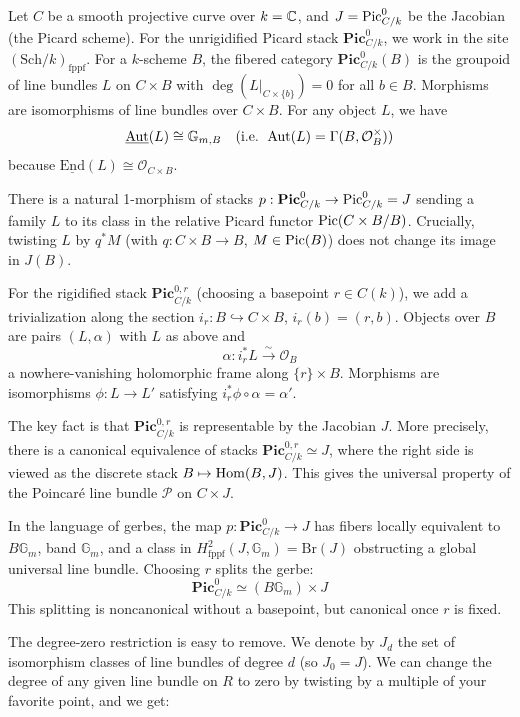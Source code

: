 \documentclass[12pt]{article}
\begin{document}
\begin{remark}
Let $C$ be a smooth projective curve over $k=\mathbb{C}$, and $J=\operatorname{Pic}^0_{C/k}$ be the Jacobian (the Picard scheme). For the unrigidified Picard stack $\mathbf{Pic}^0_{C/k}$, we work in the site $(\mathrm{Sch}/k)_{\mathrm{fppf}}$. For a $k$-scheme $B$, the fibered category $\mathbf{Pic}^0_{C/k}(B)$ is the groupoid of line bundles $L$ on $C\times B$ with $\deg(L|_{C\times\{b\}})=0$ for all $b\in B$. Morphisms are isomorphisms of line bundles over $C\times B$. For any object $L$, we have
    \[
    \underline{\mathrm{Aut}}(L)\cong\mathbb G_{m,B} \quad\text{(i.e. }\operatorname{Aut}(L)=\Gamma(B,\mathcal O_B^\times)\text{)}
    \]
    because $\underline{\mathrm{End}}(L)\cong\mathcal O_{C\times B}$. 

    There is a natural 1-morphism of stacks $p: \mathbf{Pic}^0_{C/k}\to \operatorname{Pic}^0_{C/k}=J$ sending a family $L$ to its class in the relative Picard functor $\operatorname{Pic}(C\times B/B)$. Crucially, twisting $L$ by $q^*M$ (with $q:C\times B\to B$, $M\in\operatorname{Pic}(B)$) does not change its image in $J(B)$.

    For the rigidified stack $\mathbf{Pic}^{0,r}_{C/k}$ (choosing a basepoint $r\in C(k)$), we add a trivialization along the section $i_r:B\hookrightarrow C\times B$, $i_r(b)=(r,b)$. Objects over $B$ are pairs $(L,\alpha)$ with $L$ as above and
    \[
    \alpha: i_r^*L \xrightarrow{\sim} \mathcal O_B
    \]
    a nowhere-vanishing holomorphic frame along $\{r\}\times B$. Morphisms are isomorphisms $\phi:L\to L'$ satisfying $i_r^*\phi\circ\alpha=\alpha'$.

    The key fact is that $\mathbf{Pic}^{0,r}_{C/k}$ is representable by the Jacobian $J$. More precisely, there is a canonical equivalence of stacks $\mathbf{Pic}^{0,r}_{C/k}\simeq J$, where the right side is viewed as the discrete stack $B\mapsto \operatorname{Hom}(B,J)$. This gives the universal property of the Poincaré line bundle $\mathcal P$ on $C\times J$.

    In the language of gerbes, the map $p:\mathbf{Pic}^0_{C/k}\to J$ has fibers locally equivalent to $B\mathbb G_m$, band $\mathbb G_m$, and a class in $H^2_{\mathrm{fppf}}(J,\mathbb G_m)=\mathrm{Br}(J)$ obstructing a global universal line bundle. Choosing $r$ splits the gerbe:
    \[
    \mathbf{Pic}^0_{C/k} \simeq (B\mathbb G_m)\times J
    \]
    This splitting is noncanonical without a basepoint, but canonical once $r$ is fixed.
\end{remark}

The degree-zero restriction is easy to remove.
We denote by $J_d$ the set of isomorphism classes of line bundles of degree $d$
(so $J_0 = J$).
We can change the degree of any given line bundle on $R$ to zero
by twisting by a multiple of your favorite point, and we get:
\end{document}
